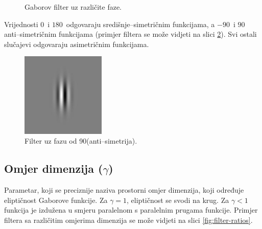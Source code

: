 \documentclass{article}
\begin{document}
\begin{figure}[htb]
  \centering
  \hspace{50pt}
  \caption{Gaborov filter uz različite faze.}
  \label{fig:filter-phases}
\end{figure}

Vrijednosti $0$\textdegree\, i $180$\textdegree\, odgovaraju
središnje--simetričnim funkcijama, a $-90$\textdegree\, i $90$\textdegree\,
anti--simetričnim funkcijama (primjer filtera se može vidjeti na slici
\ref{fig:phase-90}). Svi ostali slučajevi odgovaraju asimetričnim funkcijama.

\begin{figure}[htb]
\begin{center}
\includegraphics[width=4cm]{images/phase90.jpg}
\end{center}
\caption{Filter uz fazu od 90\textdegree (anti--simetrija).}
\label{fig:phase-90}
\end{figure}

\subsection{Omjer dimenzija ($\gamma $)}
Parametar, koji se preciznije naziva prostorni omjer dimenzija, koji određuje
eliptičnost Gaborove funkcije. Za $\gamma = 1$, eliptičnost se svodi na krug.
Za $\gamma < 1$ funkcija je izdužena u smjeru paralelnom s paralelnim prugama
funkcije. Primjer filtera sa različitim omjerima
dimenzija se može vidjeti na slici \ref{fig:filter-ratios}.
\end{document}
